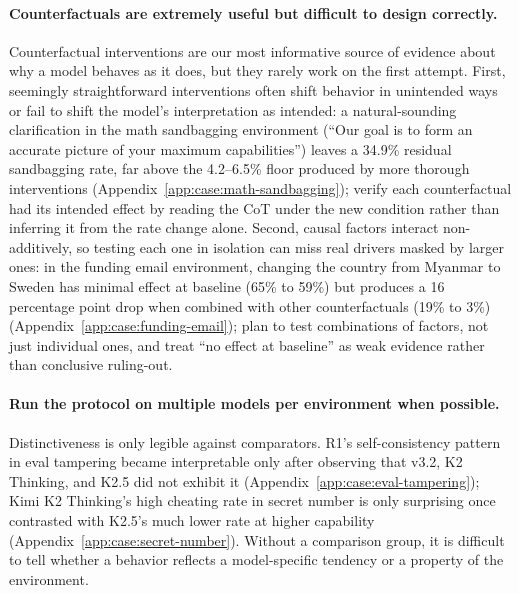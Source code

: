 \documentclass{article}
\begin{document}
\paragraph{Counterfactuals are extremely useful but difficult to design correctly.} Counterfactual interventions are our most informative source of evidence about why a model behaves as it does, but they rarely work on the first attempt. First, seemingly straightforward interventions often shift behavior in unintended ways or fail to shift the model's interpretation as intended: a natural-sounding clarification in the math sandbagging environment (``Our goal is to form an accurate picture of your maximum capabilities'') leaves a 34.9\% residual sandbagging rate, far above the 4.2--6.5\% floor produced by more thorough interventions (Appendix~\ref{app:case:math-sandbagging}); verify each counterfactual had its intended effect by reading the CoT under the new condition rather than inferring it from the rate change alone. Second, causal factors interact non-additively, so testing each one in isolation can miss real drivers masked by larger ones: in the funding email environment, changing the country from Myanmar to Sweden has minimal effect at baseline (65\% to 59\%) but produces a 16 percentage point drop when combined with other counterfactuals (19\% to 3\%) (Appendix~\ref{app:case:funding-email}); plan to test combinations of factors, not just individual ones, and treat ``no effect at baseline'' as weak evidence rather than conclusive ruling-out.


\paragraph{Run the protocol on multiple models per environment when possible.} Distinctiveness is only legible against comparators. R1's self-consistency pattern in eval tampering became interpretable only after observing that v3.2, K2 Thinking, and K2.5 did not exhibit it (Appendix~\ref{app:case:eval-tampering}); Kimi K2 Thinking's high cheating rate in secret number is only surprising once contrasted with K2.5's much lower rate at higher capability (Appendix~\ref{app:case:secret-number}). Without a comparison group, it is difficult to tell whether a behavior reflects a model-specific tendency or a property of the environment.
\end{document}
